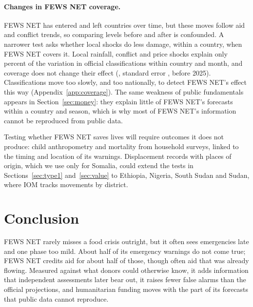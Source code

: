 \documentclass[11pt]{article}
\begin{document}
\paragraph{Changes in FEWS NET coverage.} FEWS NET has entered and left countries over time, but these moves follow aid and conflict trends, so comparing levels before and after is confounded. A narrower test asks whether local shocks do less damage, within a country, when FEWS NET covers it. Local rainfall, conflict and price shocks explain only \shockRsq{} percent of the variation in official classifications within country and month, and coverage does not change their effect (\covPre{}, standard error \covPreSe{}, before 2025). Classifications move too slowly, and too nationally, to detect FEWS NET's effect this way (Appendix~\ref{app:coverage}). The same weakness of public fundamentals appears in Section~\ref{sec:money}: they explain little of FEWS NET's forecasts within a country and season, which is why most of FEWS NET's information cannot be reproduced from public data.

Testing whether FEWS NET saves lives will require outcomes it does not produce: child anthropometry and mortality from household surveys, linked to the timing and location of its warnings. Displacement records with places of origin, which we use only for Somalia, could extend the tests in Sections~\ref{sec:type1} and~\ref{sec:value} to Ethiopia, Nigeria, South Sudan and Sudan, where IOM tracks movements by district.

\section{Conclusion}\label{sec:conclusion}

FEWS NET rarely misses a food crisis outright, but it often sees emergencies late and one phase too mild. About half of its emergency warnings do not come true; FEWS NET credits aid for about half of those, though often aid that was already flowing. Measured against what donors could otherwise know, it adds information that independent assessments later bear out, it raises fewer false alarms than the official projections, and humanitarian funding moves with the part of its forecasts that public data cannot reproduce.
\end{document}

